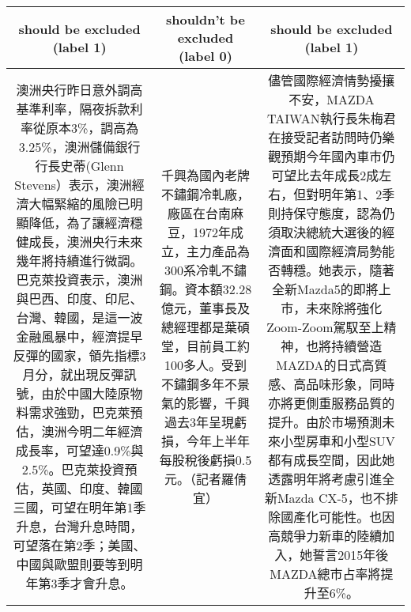{
\def\sym#1{\ifmmode^{#1}\else\(^{#1}\)\fi}
\begin{tabularx}{\textwidth}{|C|C|C|}
\hline

\textbf{should be excluded (label 1)} & 
\textbf{shouldn't be excluded (label 0)} & 
\textbf{should be excluded (label 1)}\\
\hline
澳洲央行昨日意外調高基準利率，隔夜拆款利率從原本3\%，調高為3.25\%，澳洲儲備銀行行長史蒂(Glenn Stevens）表示，澳洲經濟大幅緊縮的風險已明顯降低，為了讓經濟穩健成長，澳洲央行未來幾年將持續進行微調。巴克萊投資表示，澳洲與巴西、印度、印尼、台灣、韓國，是這一波金融風暴中，經濟提早反彈的國家，領先指標3月分，就出現反彈訊號，由於中國大陸原物料需求強勁，巴克萊預估，澳洲今明二年經濟成長率，可望達0.9\%與2.5\%。巴克萊投資預估，英國、印度、韓國三國，可望在明年第1季升息，台灣升息時間，可望落在第2季；美國、中國與歐盟則要等到明年第3季才會升息。
&
千興為國內老牌不鏽鋼冷軋廠，廠區在台南麻豆，1972年成立，主力產品為300系冷軋不鏽鋼。資本額32.28億元，董事長及總經理都是葉碩堂，目前員工約100多人。受到不鏽鋼多年不景氣的影響，千興過去3年呈現虧損，今年上半年每股稅後虧損0.5元。（記者羅倩宜）
&
儘管國際經濟情勢擾攘不安，MAZDA TAIWAN執行長朱梅君在接受記者訪問時仍樂觀預期今年國內車市仍可望比去年成長2成左右，但對明年第1、2季則持保守態度，認為仍須取決總統大選後的經濟面和國際經濟局勢能否轉穩。她表示，隨著全新Mazda5的即將上市，未來除將強化Zoom-Zoom駕馭至上精神，也將持續營造MAZDA的日式高質感、高品味形象，同時亦將更側重服務品質的提升。由於市場預測未來小型房車和小型SUV都有成長空間，因此她透露明年將考慮引進全新Mazda CX-5，也不排除國產化可能性。也因高競爭力新車的陸續加入，她誓言2015年後MAZDA總市占率將提升至6\%。
\\
\hline


\end{tabularx}}
